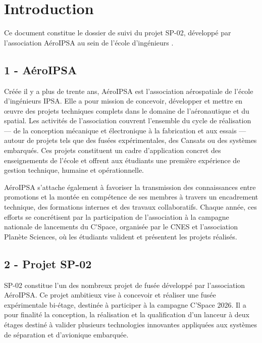 \section*{Introduction}
\label{sec:introduction}

Ce document constitue le dossier de suivi du projet SP-02, développé par l’association AéroIPSA au sein de l’école d’ingénieurs
. 

\subsection*{1 - AéroIPSA}

Créée il y a plus de trente ans, AéroIPSA est l’association aérospatiale de l’école d’ingénieurs IPSA. Elle a pour mission de
concevoir, développer et mettre en œuvre des projets techniques complets dans le domaine de l’aéronautique et du spatial. Les
activités de l’association couvrent l’ensemble du cycle de réalisation — de la conception mécanique et électronique à la
fabrication et aux essais — autour de projets tels que des fusées expérimentales, des Cansats ou des systèmes embarqués. Ces
projets constituent un cadre d’application concret des enseignements de l’école et offrent aux étudiants une première expérience
de gestion technique, humaine et opérationnelle.

AéroIPSA s’attache également à favoriser la transmission des connaissances entre promotions et la montée en compétence de ses
membres à travers un encadrement technique, des formations internes et des travaux collaboratifs. Chaque année, ces efforts se
concrétisent par la participation de l’association à la campagne nationale de lancements du \gls{C'Space}, organisée par le
\acrfull{CNES} et l'association Planète Sciences, où les étudiants valident et présentent les projets réalisés.

\subsection*{2 - Projet SP-02}

SP-02 constitue l'un des nombreux projet de fusée développé par l’association AéroIPSA. Ce projet ambitieux vise à concevoir et
réaliser une fusée expérimentale bi-étage, destinée à participer à la campagne C'Space 2026. Il a pour finalité la conception,
la réalisation et la qualification d’un lanceur à deux étages destiné à valider plusieurs technologies innovantes appliquées
aux systèmes de séparation et d’avionique embarquée.

